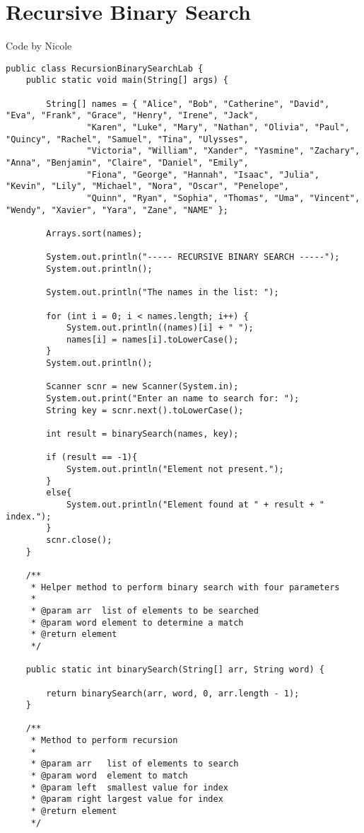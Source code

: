 \documentclass{article}
\begin{document}
\section{Recursive Binary Search}
Code by Nicole
\begin{verbatim}
public class RecursionBinarySearchLab {
	public static void main(String[] args) {

		String[] names = { "Alice", "Bob", "Catherine", "David", "Eva", "Frank", "Grace", "Henry", "Irene", "Jack",
				"Karen", "Luke", "Mary", "Nathan", "Olivia", "Paul", "Quincy", "Rachel", "Samuel", "Tina", "Ulysses",
				"Victoria", "William", "Xander", "Yasmine", "Zachary", "Anna", "Benjamin", "Claire", "Daniel", "Emily",
				"Fiona", "George", "Hannah", "Isaac", "Julia", "Kevin", "Lily", "Michael", "Nora", "Oscar", "Penelope",
				"Quinn", "Ryan", "Sophia", "Thomas", "Uma", "Vincent", "Wendy", "Xavier", "Yara", "Zane", "NAME" };

		Arrays.sort(names);

		System.out.println("----- RECURSIVE BINARY SEARCH -----");
		System.out.println();

		System.out.println("The names in the list: ");

		for (int i = 0; i < names.length; i++) {
			System.out.println((names)[i] + " ");
			names[i] = names[i].toLowerCase();
		}
		System.out.println();

		Scanner scnr = new Scanner(System.in);
		System.out.print("Enter an name to search for: ");
		String key = scnr.next().toLowerCase();

		int result = binarySearch(names, key);

		if (result == -1){
			System.out.println("Element not present.");
		}
		else{
			System.out.println("Element found at " + result + " index.");
		}
		scnr.close();
	}

	/**
	 * Helper method to perform binary search with four parameters
	 * 
	 * @param arr  list of elements to be searched
	 * @param word element to determine a match
	 * @return element
	 */

	public static int binarySearch(String[] arr, String word) {

		return binarySearch(arr, word, 0, arr.length - 1);
	}

	/**
	 * Method to perform recursion
	 * 
	 * @param arr   list of elements to search
	 * @param word  element to match
	 * @param left  smallest value for index
	 * @param right largest value for index
	 * @return element
	 */


\end{verbatim}
\end{document}
